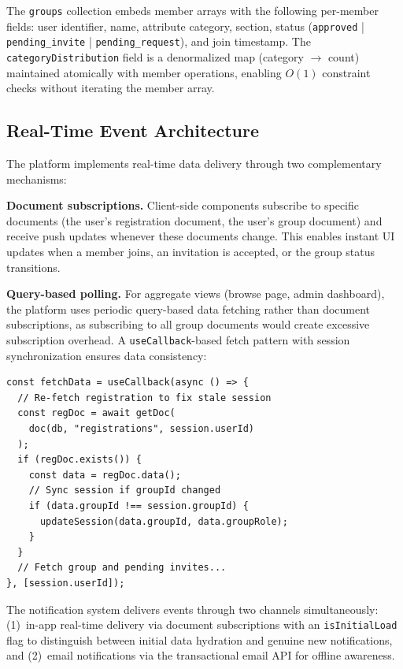 \documentclass[11pt,a4paper]{article}
\theoremstyle{plain}
\theoremstyle{definition}
\theoremstyle{remark}
\begin{document}
The \texttt{groups} collection embeds member arrays with the following per-member fields: user identifier, name, attribute category, section, status (\texttt{approved} | \texttt{pending\_invite} | \texttt{pending\_request}), and join timestamp. The \texttt{categoryDistribution} field is a denormalized map (category $\rightarrow$ count) maintained atomically with member operations, enabling $O(1)$ constraint checks without iterating the member array.

\subsection{Real-Time Event Architecture}

The platform implements real-time data delivery through two complementary mechanisms:

\textbf{Document subscriptions.} Client-side components subscribe to specific documents (the user's registration document, the user's group document) and receive push updates whenever these documents change. This enables instant UI updates when a member joins, an invitation is accepted, or the group status transitions.

\textbf{Query-based polling.} For aggregate views (browse page, admin dashboard), the platform uses periodic query-based data fetching rather than document subscriptions, as subscribing to all group documents would create excessive subscription overhead. A \texttt{useCallback}-based fetch pattern with session synchronization ensures data consistency:

\begin{lstlisting}[language={}, caption={Session synchronization pattern}, label={lst:sessionsync}]
const fetchData = useCallback(async () => {
  // Re-fetch registration to fix stale session
  const regDoc = await getDoc(
    doc(db, "registrations", session.userId)
  );
  if (regDoc.exists()) {
    const data = regDoc.data();
    // Sync session if groupId changed
    if (data.groupId !== session.groupId) {
      updateSession(data.groupId, data.groupRole);
    }
  }
  // Fetch group and pending invites...
}, [session.userId]);
\end{lstlisting}

The notification system delivers events through two channels simultaneously: (1)~in-app real-time delivery via document subscriptions with an \texttt{isInitialLoad} flag to distinguish between initial data hydration and genuine new notifications, and (2)~email notifications via the transactional email API for offline awareness.
\end{document}
